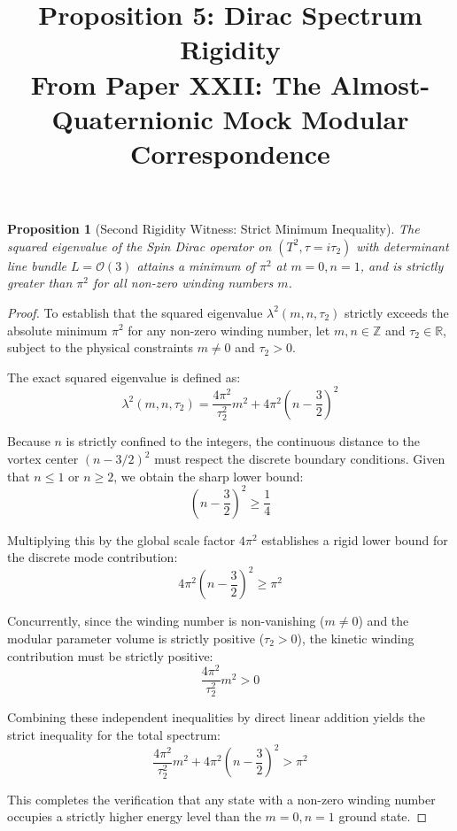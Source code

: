 \documentclass[12pt]{article}
\title{\vspace{-2em}Proposition 5: Dirac Spectrum Rigidity\\
\large From Paper XXII: The Almost-Quaternionic Mock Modular Correspondence}
\author{}
\date{}
\newtheorem{prop}{Proposition}
\begin{document}
\maketitle

\begin{prop}[Second Rigidity Witness: Strict Minimum Inequality]
The squared eigenvalue of the Spin Dirac operator on $(T^2, \tau = i\tau_2)$ with determinant line bundle $L = \mathcal{O}(3)$ attains a minimum of $\pi^2$ at $m=0, n=1$, and is strictly greater than $\pi^2$ for all non-zero winding numbers $m$.
\end{prop}

\begin{proof}
To establish that the squared eigenvalue $\lambda^2(m, n, \tau_2)$ strictly exceeds the absolute minimum $\pi^2$ for any non-zero winding number, let $m, n \in \mathbb{Z}$ and $\tau_2 \in \mathbb{R}$, subject to the physical constraints $m \neq 0$ and $\tau_2 > 0$.

The exact squared eigenvalue is defined as:
\begin{equation}
    \lambda^2(m, n, \tau_2) = \frac{4\pi^2}{\tau_2^2} m^2 + 4\pi^2 \left(n - \frac{3}{2}\right)^2
\end{equation}

Because $n$ is strictly confined to the integers, the continuous distance to the vortex center $\left(n - 3/2\right)^2$ must respect the discrete boundary conditions. Given that $n \le 1$ or $n \ge 2$, we obtain the sharp lower bound:
\begin{equation}
    \left(n - \frac{3}{2}\right)^2 \ge \frac{1}{4}
\end{equation}

Multiplying this by the global scale factor $4\pi^2$ establishes a rigid lower bound for the discrete mode contribution:
\begin{equation}
    4\pi^2 \left(n - \frac{3}{2}\right)^2 \ge \pi^2
\end{equation}

Concurrently, since the winding number is non-vanishing ($m \neq 0$) and the modular parameter volume is strictly positive ($\tau_2 > 0$), the kinetic winding contribution must be strictly positive:
\begin{equation}
    \frac{4\pi^2}{\tau_2^2} m^2 > 0
\end{equation}

Combining these independent inequalities by direct linear addition yields the strict inequality for the total spectrum:
\begin{equation}
    \frac{4\pi^2}{\tau_2^2} m^2 + 4\pi^2 \left(n - \frac{3}{2}\right)^2 > \pi^2
\end{equation}

This completes the verification that any state with a non-zero winding number occupies a strictly higher energy level than the $m=0, n=1$ ground state.
\end{proof}
\end{document}
